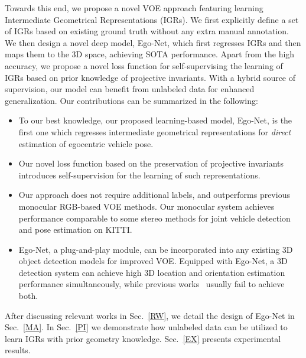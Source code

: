 \documentclass[final]{cvpr}
\begin{document}
Towards this end, we propose a novel VOE approach featuring learning Intermediate Geometrical Representations (IGRs). We first explicitly define a set of IGRs based on existing ground truth without any extra manual annotation. We then design a novel deep model, Ego-Net, which first regresses IGRs and then maps them to the 3D space,  achieving SOTA performance. Apart from the high accuracy, we propose a novel loss function for self-supervising the learning of IGRs based on prior knowledge of projective invariants. With a hybrid source of supervision, our model can benefit from unlabeled data for enhanced generalization. Our contributions can be summarized in the following:   
\begin{itemize}
\item To our best knowledge, our proposed learning-based model, Ego-Net, is the first one which regresses intermediate geometrical representations  for \emph{direct} estimation of egocentric vehicle pose.
\item Our novel loss function based on the preservation of projective invariants introduces self-supervision for the learning of such representations.
\item Our approach does not require additional labels, and outperforms previous monocular RGB-based VOE methods. Our monocular system achieves performance comparable to some stereo methods for joint vehicle detection and pose estimation on KITTI.	
\item Ego-Net, a plug-and-play module, can be incorporated into any existing 3D object detection models for improved VOE. Equipped with Ego-Net, a 3D detection system can achieve high 3D location and orientation estimation performance simultaneously, while previous works~\cite{brazil2019m3d, Ding_2020_CVPR, kinematic-3d} usually fail to achieve both.
\end{itemize}

After discussing relevant works in Sec.~\ref{RW}, we detail the design of Ego-Net in Sec.~\ref{MA}. In Sec.~\ref{PI} we demonstrate how unlabeled data can be utilized to learn IGRs with prior geometry knowledge. Sec.~\ref{EX} presents experimental results. 
\end{document}
